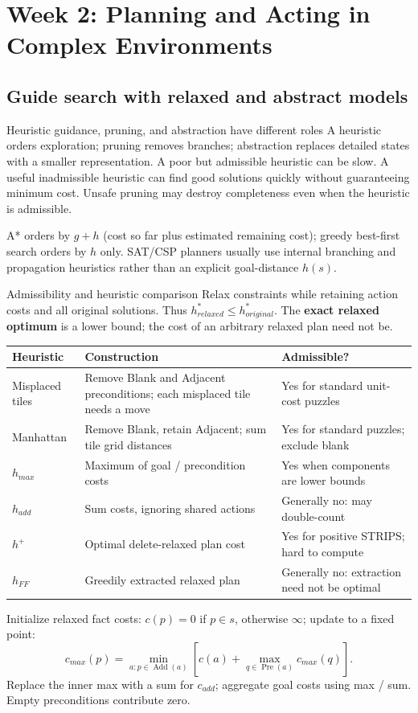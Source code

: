\documentclass[10pt,a4paper]{article}
\newcommand{\Pre}{\operatorname{Pre}}
\newcommand{\Add}{\operatorname{Add}}
\newcommand{\topic}[1]{\clearpage\section{#1}}
\begin{document}
\topic{Week 2: Planning and Acting in Complex Environments}



\subsection{Guide search with relaxed and abstract models}
\begin{card}{Heuristic guidance, pruning, and abstraction have different roles}
A heuristic orders exploration; pruning removes branches; abstraction replaces detailed states with a smaller representation. A poor but admissible heuristic can be slow. A useful inadmissible heuristic can find good solutions quickly without guaranteeing minimum cost. Unsafe pruning may destroy completeness even when the heuristic is admissible.

A* orders by $g+h$ (cost so far plus estimated remaining cost); greedy best-first search orders by $h$ only. SAT/CSP planners usually use internal branching and propagation heuristics rather than an explicit goal-distance $h(s)$.
\end{card}

\begin{card}{Admissibility and heuristic comparison}
Relax constraints while retaining action costs and all original solutions. Thus $h^*_{relaxed}\le h^*_{original}$. The \textbf{exact relaxed optimum} is a lower bound; the cost of an arbitrary relaxed plan need not be.
\small
\par\smallskip
\begin{tabularx}{\linewidth}{@{}P{2.3cm}Y P{3.7cm}@{}}
\toprule Heuristic & Construction & Admissible? \\\midrule
Misplaced tiles & Remove Blank and Adjacent preconditions; each misplaced tile needs a move & Yes for standard unit-cost puzzles \\
Manhattan & Remove Blank, retain Adjacent; sum tile grid distances & Yes for standard puzzles; exclude blank \\
$h_{max}$ & Maximum of goal / precondition costs & Yes when components are lower bounds \\
$h_{add}$ & Sum costs, ignoring shared actions & Generally no: may double-count \\
$h^+$ & Optimal delete-relaxed plan cost & Yes for positive STRIPS; hard to compute \\
$h_{FF}$ & Greedily extracted relaxed plan & Generally no: extraction need not be optimal \\\bottomrule
\end{tabularx}\par\smallskip
\normalsize
Initialize relaxed fact costs: $c(p)=0$ if $p\in s$, otherwise $\infty$; update to a fixed point:
\[
c_{max}(p)=\min_{a:p\in\Add(a)}\left[c(a)+\max_{q\in\Pre(a)}c_{max}(q)\right].
\]
Replace the inner max with a sum for $c_{add}$; aggregate goal costs using max / sum. Empty preconditions contribute zero.
\end{card}
\end{document}
